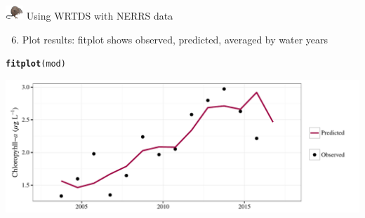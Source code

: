 \documentclass[xcolor=dvipsnames,serif]{beamer}\usepackage[]{graphicx}\usepackage[]{color}
\makeatletter
\def\maxwidth{ %
  \ifdim\Gin@nat@width>\linewidth
    \linewidth
  \else
    \Gin@nat@width
  \fi
}
\newcommand{\hlstd}[1]{\textcolor[rgb]{0.345,0.345,0.345}{#1}}%
\newcommand{\hlkwd}[1]{\textcolor[rgb]{0.737,0.353,0.396}{\textbf{#1}}}%
\newenvironment{kframe}{%
 \def\at@end@of@kframe{}%
 \ifinner\ifhmode%
  \def\at@end@of@kframe{\end{minipage}}%
  \begin{minipage}{\columnwidth}%
 \fi\fi%
 \def\FrameCommand##1{\hskip\@totalleftmargin \hskip-\fboxsep
 \colorbox{shadecolor}{##1}\hskip-\fboxsep
     \hskip-\linewidth \hskip-\@totalleftmargin \hskip\columnwidth}%
 \MakeFramed {\advance\hsize-\width
   \@totalleftmargin\z@ \linewidth\hsize
   \@setminipage}}%
 {\par\unskip\endMakeFramed%
 \at@end@of@kframe}
\newenvironment{knitrout}{}{} %
\makeatother
\begin{document}
\begin{frame}[t, fragile]{\includegraphics[width = 0.05\textwidth]{imgs/swmprat.png} Using WRTDS with NERRS data}{}
\begin{enumerate}
\setcounter{enumi}{5}
\item Plot results: fitplot shows observed, predicted, averaged by water years
\end{enumerate}
\begin{knitrout}\scriptsize
{}\color{fgcolor}\begin{kframe}
\begin{alltt}
\hlkwd{fitplot}\hlstd{(mod)}
\end{alltt}
\end{kframe}

{\centering \includegraphics[width=\maxwidth]{imgs/wrtdsplo1-1} 

}



\end{knitrout}
\end{frame}
\end{document}
